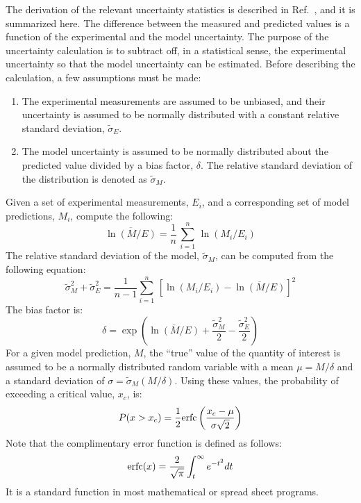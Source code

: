\documentclass[graybox]{svmult}
\begin{document}
The derivation of the relevant uncertainty statistics is described in Ref.~\cite{McGrattan:Metrologia}, and it is summarized here. The difference between the measured and predicted values is a function of the experimental and the model uncertainty. The purpose of the uncertainty calculation is to subtract off, in a statistical sense, the experimental uncertainty so that the model uncertainty can be estimated. Before describing the calculation, a few assumptions must be made:
\begin{enumerate}
\item The experimental measurements are assumed to be unbiased, and their uncertainty is assumed to be normally distributed with a constant relative standard deviation, $\widetilde{\sigma}_E$.
\item The model uncertainty is assumed to be normally distributed about the predicted value divided by a bias factor, $\delta$. The relative standard deviation of the distribution is denoted as $\widetilde{\sigma}_M$.
\end{enumerate}
Given a set of experimental measurements, $E_i$, and a corresponding set of model predictions, $M_i$, compute the following:
\begin{equation}
   \overline{\ln (M/E)} = \frac{1}{n} \, \sum_{i=1}^n \, \ln (M_i/E_i)
\end{equation}
The relative standard deviation of the model, $\widetilde{\sigma}_M$, can be computed from the following equation:
\begin{equation}
   \widetilde{\sigma}_M^2 + \widetilde{\sigma}_E^2 = \frac{1}{n-1} \sum_{i=1}^n \,
   \left[ \ln (M_i/E_i) - \overline{\ln (M/E)}  \right]^2 \label{stdev}
\end{equation}
The bias factor is:
\begin{equation}
   \delta = \exp \left( \overline{\ln (M/E)} + \frac{ \widetilde{\sigma}_M^2}{2}-\frac{\widetilde{\sigma}_E^2}{2} \right) \label{delta}
\end{equation}
For a given model prediction, $M$, the ``true'' value of the quantity of interest is assumed to be a normally distributed random variable with a mean $\mu=M/\delta$ and a standard deviation of $\sigma=\widetilde{\sigma}_M (M/\delta)$.
Using these values, the probability of exceeding a critical value, $x_c$, is:
\begin{equation}
   P(x>x_c) = \frac{1}{2} \hbox{erfc} \left( \frac{x_c-\mu}{\sigma \sqrt{2}} \right)
\end{equation}
Note that the complimentary error function is defined as follows:
\begin{equation}
   \hbox{erfc}(x) = \frac{2}{\sqrt{\pi}} \int_t^\infty e^{-t^2} dt
\end{equation}
It is a standard function in most mathematical or spread sheet programs.
\end{document}
